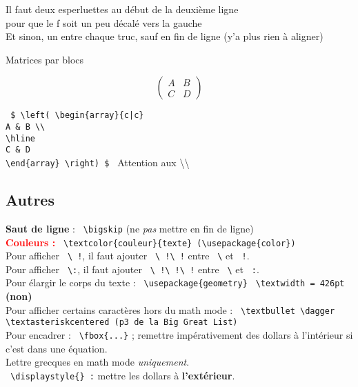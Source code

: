 \documentclass{report}
\begin{document}

Il faut deux esperluettes au début de la deuxième ligne \\
pour que le f soit un peu décalé vers la gauche \\
Et sinon, un entre chaque truc, sauf en fin de ligne (y'a plus rien à aligner) 

Matrices par blocs

$$
\left(
\begin{array}{c|c}
A & B\\
\hline
C & D
\end{array}
\right)
$$

\texttt{
\$ \textbackslash{}left( \textbackslash{}begin\{array\}\{c|c\} \\
A \& B \textbackslash{}\textbackslash{} \\
\textbackslash{}hline \\
C \& D \\
\textbackslash{}end\{array\} \textbackslash{}right) \$
} Attention aux \textbackslash{}\textbackslash{}


\subsection*{Autres}

\textbf{Saut de ligne} : \texttt{ \textbackslash{}bigskip} \quad (ne \textit{pas} mettre en fin de ligne) \\
\textbf{\textcolor{red}{Couleurs :}} \texttt{ \textbackslash{}textcolor\{couleur\}\{texte\}  (\textbackslash{}usepackage\{color\})}\\
Pour afficher \texttt{ \textbackslash{}\!\! !}, il faut ajouter \texttt{ \textbackslash{}\!\! !\textbackslash{}\!\! !} entre \texttt{ \textbackslash{}} et \texttt{ !}. \\
Pour afficher \texttt{ \textbackslash{}\!\!\!:}, il faut ajouter \texttt{ \textbackslash{}\!\! !\textbackslash{}\!\! !\textbackslash{}\!\! !} entre \texttt{ \textbackslash{}} et \texttt{ :}. \\
Pour élargir le corps du texte : \texttt{ \textbackslash{}usepackage\{geometry\}} \quad \texttt{ \textbackslash{}textwidth = 426pt} \textbf{(non)} \\
Pour afficher certains caractères hors du math mode : \texttt{ \textbackslash{}textbullet \textbackslash{}dagger \textbackslash{}textasteriskcentered (p3 de la Big Great List)} \\
Pour encadrer : \texttt{ \textbackslash{}fbox\{...\}} ; remettre impérativement des dollars à l'intérieur si c'est dans une équation. \\
Lettre grecques en math mode \textit{uniquement}.\\
\texttt{ \textbackslash{}displaystyle\{\} :} mettre les dollars à \textbf{l'extérieur}. 
\end{document}
